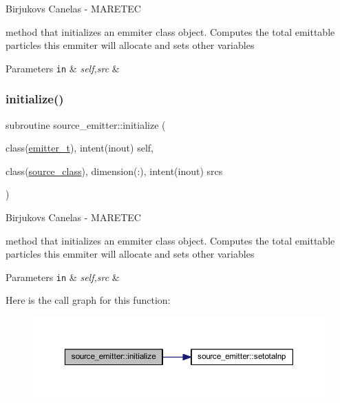 Birjukovs Canelas -\/ M\+A\+R\+E\+T\+EC 

method that initializes an emmiter class object. Computes the total emittable particles this emmiter will allocate and sets other variables 
\begin{DoxyParams}[1]{Parameters}
\mbox{\tt in}  & {\em self,src} & \\
\hline
\end{DoxyParams}
\mbox{\label{namespacesource__emitter_a6400b97541c15fcf0ec523b359aacac9}} 
\subsubsection{\texorpdfstring{initialize()}{initialize()}}
{\footnotesize\ttfamily subroutine source\+\_\+emitter\+::initialize (\begin{DoxyParamCaption}\item[{class(\mbox{\hyperlink{structsource__emitter_1_1emitter__t}{emitter\+\_\+t}}), intent(inout)}]{self,  }\item[{class(\mbox{\hyperlink{structsource__identity_1_1source__class}{source\+\_\+class}}), dimension(\+:), intent(inout)}]{srcs }\end{DoxyParamCaption})\hspace{0.3cm}{\ttfamily [private]}}



Birjukovs Canelas -\/ M\+A\+R\+E\+T\+EC 

method that initializes an emmiter class object. Computes the total emittable particles this emmiter will allocate and sets other variables 
\begin{DoxyParams}[1]{Parameters}
\mbox{\tt in}  & {\em self,src} & \\
\hline
\end{DoxyParams}
Here is the call graph for this function\+:
\nopagebreak
\begin{figure}[H]
\begin{center}
\leavevmode
\includegraphics[width=350pt]{namespacesource__emitter_a6400b97541c15fcf0ec523b359aacac9_cgraph}
\end{center}
\end{figure}
\mbox{\label{namespacesource__emitter_a2fb64d19c0016b31bd9dab0a13785d61}} 
